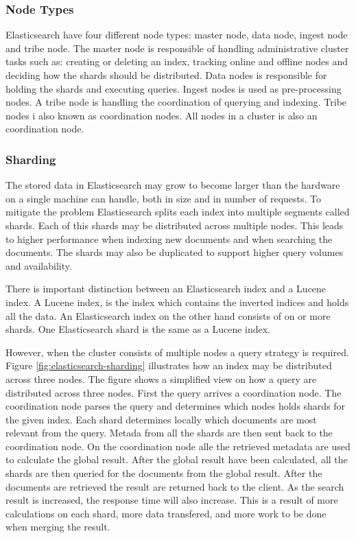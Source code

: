 \subsubsection{Node Types}
Elasticsearch have four different node types: master node, data node, ingest node and tribe node.
The master node is responsible of handling administrative cluster tasks such as:
creating or deleting an index, tracking online and offline nodes and deciding how the shards should be distributed.
Data nodes is responsible for holding the shards and executing queries.
Ingest nodes is used as pre-processing nodes.
A tribe node is handling the coordination of querying and indexing.
Tribe nodes i also known as coordination nodes.
All nodes in a cluster is also an coordination node.

\subsubsection{Sharding}
The stored data in Elasticsearch may grow to become larger than the hardware on a single machine can handle,
both in size and in number of requests.
To mitigate the problem Elasticsearch splits each index into multiple segments called shards.
Each of this shards may be distributed across multiple nodes.
This leads to higher performance when indexing new documents and when searching the documents.
The shards may also be duplicated to support higher query volumes and availability.

There is important distinction between an Elasticsearch index and a Lucene index.
A Lucene index, is the index which contains the inverted indices and holds all the data.
An Elasticsearch index on the other hand consists of on or more shards.
One Elasticsearch shard is the same as a Lucene index.

However, when the cluster consists of multiple nodes a query strategy is required.
Figure \ref{fig:elasticsearch-sharding} illustrates how an index may be distributed across three nodes.
The figure shows a simplified view on how a query are distributed across three nodes.
First the query arrives a coordination node.
The coordination node parses the query and determines which nodes holds shards for the given index.
Each shard determines locally which documents are most relevant from the query.
Metada from all the shards are then sent back to the coordination node.
On the coordination node alle the retrieved metadata are used to calculate the global result.
After the global result have been calculated,
all the shards are then queried for the documents from the global result.
After the documents are retrieved the result are returned back to the client.
As the search result is increased, the response time will also increase.
This is a result of more calculations on each shard,
more data transfered,
and more work to be done when merging the result.

